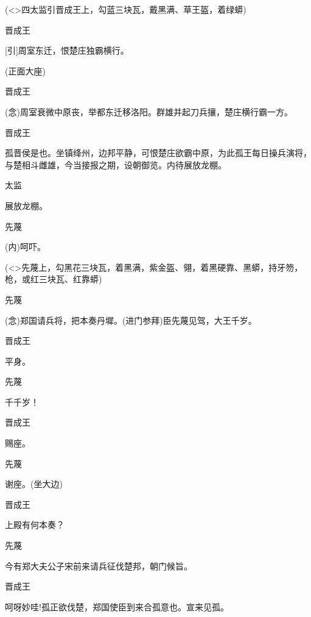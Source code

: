 {(\textless{}\!\textgreater{}四太监引晋成王上，勾蓝三块瓦，戴黑满、草王盔，着绿蟒)

晋成王\hspace{20pt}~

{[}引{]}周室东迁，恨楚庄独霸横行。

(正面大座)

晋成王

({\akai 念})周室衰微中原丧，举都东迁移洛阳。群雄并起刀兵攘，楚庄横行霸一方。

晋成王

孤晋侯是也。坐镇绛州，边邦平静，可恨楚庄欲霸中原，为此孤王每日操兵演将，与楚相斗雌雄，今当接报之期，设朝御览。内待展放龙棚。

太监\hspace{30pt}~

展放龙棚。

先蔑\hspace{30pt}~

({\akai 内})呵吓。

(\textless{}\!\textgreater{}先蔑上，勾黑花三块瓦，着黑满，紫金盔、翎，着黑硬靠、黑蟒，持牙笏，枪，或红三块瓦、红靠蟒)

先蔑\hspace{30pt}~

({\akai 念})郑国请兵将，把本奏丹墀。(进门参拜)臣先蔑见驾，大王千岁。

晋成王\hspace{20pt}~

平身。

先蔑\hspace{30pt}~

千千岁！

晋成王\hspace{20pt}~

赐座。

先蔑\hspace{30pt}~

谢座。(坐大边)

晋成王\hspace{20pt}~

上殿有何本奏？

先蔑\hspace{30pt}~

今有郑大夫公子宋前来请兵征伐楚邦，朝门候旨。

晋成王\hspace{20pt}~

呵呀妙哇!孤正欲伐楚，郑国使臣到来合孤意也。宣来见孤。

}
